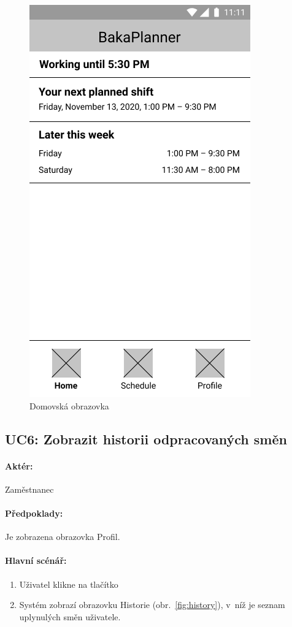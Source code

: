 \documentclass[twoside]{ctuthesis}
\begin{document}
\begin{figure}[h]
	\includegraphics[scale=.35]{img/main-home.png}
	\caption{Domovská obrazovka}
	\label{fig:home}
\end{figure}
\newpage
\subsection{UC6: Zobrazit historii odpracovaných směn}
\paragraph{Aktér:} Zaměstnanec
\paragraph{Předpoklady:} Je zobrazena obrazovka Profil.
\paragraph{Hlavní scénář:}
\begin{enumerate}
	\item Uživatel klikne na tlačítko 
	\item Systém zobrazí obrazovku Historie (obr.~\ref{fig:history}), v~níž je seznam uplynulých směn uživatele.
\end{enumerate}
\end{document}
